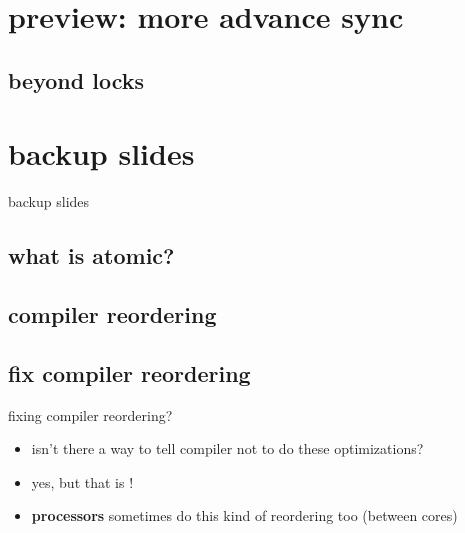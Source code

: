 \section{preview: more advance sync}


\subsection{beyond locks}







\section{backup slides}
\begin{frame}{backup slides}
\end{frame}

\subsection{what is atomic?}


\subsection{compiler reordering}


\subsection{fix compiler reordering}
\begin{frame}{fixing compiler reordering?}
    \begin{itemize}
    \item isn't there a way to tell compiler not to do these optimizations?
    \item yes, but that is !
    \item \textbf{processors} sometimes do this kind of reordering too (between cores)
    \end{itemize}
\end{frame}



